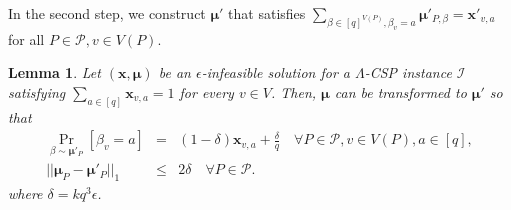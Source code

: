 \documentclass[letterpaper, 11pt]{article}
\newtheorem{lemma}[theorem]{Lemma}
\newcommand{\calI}{\mathcal{I}}
\newcommand{\calP}{\mathcal{P}}
\newcommand{\bix}{\boldsymbol{x}}
\newcommand{\bimu}{\boldsymbol{\mu}}
\begin{document}
In the second step,
we construct $\bimu'$ that satisfies $\sum_{\beta\in [q]^{V(P)},\beta_v=a}\bimu'_{P,\beta}=\bix'_{v,a}$ for all $P\in \calP, v\in V(P)$.
\begin{lemma}\label{lmm:smoothing}
  Let $(\bix,\bimu)$ be an $\epsilon$-infeasible solution for a $\Lambda$-CSP instance $\calI$ satisfying $\sum_{a\in [q]}\bix_{v,a}=1$ for every $v\in V$.
  Then, $\bimu$ can be transformed to $\bimu'$ so that
  \begin{eqnarray*}
    \Pr_{\beta\sim \bimu'_P}[\beta_v=a]&=&(1-\delta)\bix_{v,a}+\frac{\delta}{q} \quad \forall P\in \calP, v\in V(P), a\in [q], \\
    ||\bimu_P-\bimu'_P||_1&\leq& 2\delta \quad \forall P\in \calP.
  \end{eqnarray*}
  where $\delta=kq^3\epsilon$.
\end{lemma}
\end{document}
